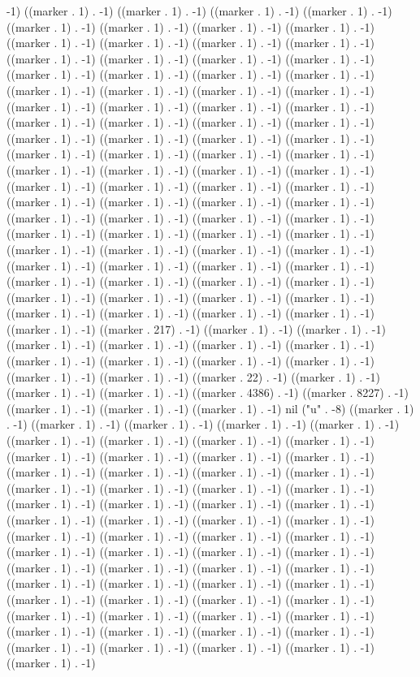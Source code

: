-1) ((marker . 1) . -1) ((marker . 1) . -1) ((marker . 1) . -1) ((marker . 1) . -1) ((marker . 1) . -1) ((marker . 1) . -1) ((marker . 1) . -1) ((marker . 1) . -1) ((marker . 1) . -1) ((marker . 1) . -1) ((marker . 1) . -1) ((marker . 1) . -1) ((marker . 1) . -1) ((marker . 1) . -1) ((marker . 1) . -1) ((marker . 1) . -1) ((marker . 1) . -1) ((marker . 1) . -1) ((marker . 1) . -1) ((marker . 1) . -1) ((marker . 1) . -1) ((marker . 1) . -1) ((marker . 1) . -1) ((marker . 1) . -1) ((marker . 1) . -1) ((marker . 1) . -1) ((marker . 1) . -1) ((marker . 1) . -1) ((marker . 1) . -1) ((marker . 1) . -1) ((marker . 1) . -1) ((marker . 1) . -1) ((marker . 1) . -1) ((marker . 1) . -1) ((marker . 1) . -1) ((marker . 1) . -1) ((marker . 1) . -1) ((marker . 1) . -1) ((marker . 1) . -1) ((marker . 1) . -1) ((marker . 1) . -1) ((marker . 1) . -1) ((marker . 1) . -1) ((marker . 1) . -1) ((marker . 1) . -1) ((marker . 1) . -1) ((marker . 1) . -1) ((marker . 1) . -1) ((marker . 1) . -1) ((marker . 1) . -1) ((marker . 1) . -1) ((marker . 1) . -1) ((marker . 1) . -1) ((marker . 1) . -1) ((marker . 1) . -1) ((marker . 1) . -1) ((marker . 1) . -1) ((marker . 1) . -1) ((marker . 1) . -1) ((marker . 1) . -1) ((marker . 1) . -1) ((marker . 1) . -1) ((marker . 1) . -1) ((marker . 1) . -1) ((marker . 1) . -1) ((marker . 1) . -1) ((marker . 1) . -1) ((marker . 1) . -1) ((marker . 1) . -1) ((marker . 1) . -1) ((marker . 1) . -1) ((marker . 1) . -1) ((marker . 1) . -1) ((marker . 1) . -1) ((marker . 1) . -1) ((marker . 1) . -1) ((marker . 1) . -1) ((marker . 1) . -1) ((marker . 1) . -1) ((marker . 1) . -1) ((marker . 1) . -1) ((marker . 217) . -1) ((marker . 1) . -1) ((marker . 1) . -1) ((marker . 1) . -1) ((marker . 1) . -1) ((marker . 1) . -1) ((marker . 1) . -1) ((marker . 1) . -1) ((marker . 1) . -1) ((marker . 1) . -1) ((marker . 1) . -1) ((marker . 1) . -1) ((marker . 1) . -1) ((marker . 22) . -1) ((marker . 1) . -1) ((marker . 1) . -1) ((marker . 1) . -1) ((marker . 4386) . -1) ((marker . 8227) . -1) ((marker . 1) . -1) ((marker . 1) . -1) ((marker . 1) . -1) nil ("u" . -8) ((marker . 1) . -1) ((marker . 1) . -1) ((marker . 1) . -1) ((marker . 1) . -1) ((marker . 1) . -1) ((marker . 1) . -1) ((marker . 1) . -1) ((marker . 1) . -1) ((marker . 1) . -1) ((marker . 1) . -1) ((marker . 1) . -1) ((marker . 1) . -1) ((marker . 1) . -1) ((marker . 1) . -1) ((marker . 1) . -1) ((marker . 1) . -1) ((marker . 1) . -1) ((marker . 1) . -1) ((marker . 1) . -1) ((marker . 1) . -1) ((marker . 1) . -1) ((marker . 1) . -1) ((marker . 1) . -1) ((marker . 1) . -1) ((marker . 1) . -1) ((marker . 1) . -1) ((marker . 1) . -1) ((marker . 1) . -1) ((marker . 1) . -1) ((marker . 1) . -1) ((marker . 1) . -1) ((marker . 1) . -1) ((marker . 1) . -1) ((marker . 1) . -1) ((marker . 1) . -1) ((marker . 1) . -1) ((marker . 1) . -1) ((marker . 1) . -1) ((marker . 1) . -1) ((marker . 1) . -1) ((marker . 1) . -1) ((marker . 1) . -1) ((marker . 1) . -1) ((marker . 1) . -1) ((marker . 1) . -1) ((marker . 1) . -1) ((marker . 1) . -1) ((marker . 1) . -1) ((marker . 1) . -1) ((marker . 1) . -1) ((marker . 1) . -1) ((marker . 1) . -1) ((marker . 1) . -1) ((marker . 1) . -1) ((marker . 1) . -1) ((marker . 1) . -1) ((marker . 1) . -1) ((marker . 1) . -1) ((marker . 1) . -1) ((marker . 1) . -1) ((marker . 1) . -1) ((marker . 1) . -1) 